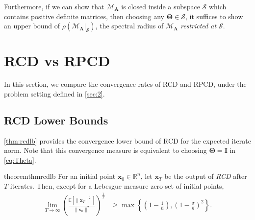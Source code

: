 \documentclass{article}
\theoremstyle{plain}
\theoremstyle{definition}
\theoremstyle{remark}
\def\bigopen#1{\left(#1\right)}
\def\bigset#1{\left\{#1\right\}}
\def\bigclosed#1{\left[#1\right]}
\newcommand{\mTheta}{\bm{\Theta}}
\def\vx{{\bm{x}}}
\def\mA{{\bm{A}}}
\def\mI{{\bm{I}}}
\def\gM{{\mathcal{M}}}
\def\gS{{\mathcal{S}}}
\newcommand{\E}{\mathbb{E}}
\newcommand{\R}{\mathbb{R}}
\begin{document}
Furthermore, if we can show that $\gM_{\mA}$ is closed inside a subspace $\gS$ which contains positive definite matrices, then choosing any $\mTheta \in \gS$, it suffices to show an upper bound of $\rho(\left. \gM_{\mA} \right|_{\gS})$, the spectral radius of $\gM_{\mA}$ \emph{restricted at $\gS$}.

\section{RCD vs RPCD}
\label{sec:3}
In this section, we compare the convergence rates of RCD and RPCD, under the problem setting defined in \cref{sec:2}.



\subsection{RCD Lower Bounds}
\cref{thm:rcdlb} provides the convergence lower bound of RCD for the expected iterate norm.
Note that this convergence measure is equivalent to choosing $\mTheta = \mI$ in \eqref{eq:Theta}.
\begin{restatable}{theorem}{thmrcdlb}
    \label{thm:rcdlb}
    For an initial point $\vx_0\in \R^{n}$, let $\vx_T$ be the output of \emph{RCD} after $T$ iterates. Then, except for a Lebesgue measure zero set of initial points, 
    \begin{align*}
        \lim_{T \to \infty} \bigopen{\frac{\E\bigclosed{\|\vx_T\|^2}}{\|\vx_0\|^2}}^{\frac{1}{T}} \!\! &\ge \max \bigset{\bigopen{1 - \frac{1}{n}}, \bigopen{1 - \frac{\sigma}{n}}^{2}}.
    \end{align*}
\end{restatable}
\end{document}
